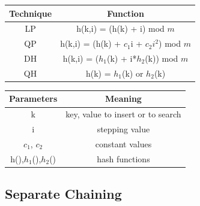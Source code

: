\documentclass{article}
\begin{document}
\begin{center}
\begin{tabular}{c|c}
    Technique & Function\\
\hline
    LP & h(k,i) = (h(k) + i) mod $m$ \\
\hline
    QP & h(k,i) = (h(k) + $c_1$i + $c_2i^2$) mod $m$ \\
\hline
    DH & h(k,i) = ($h_1$(k) + i*$h_2$(k)) mod $m$ \\
\hline
    QH & h(k) = $h_1$(k) or $h_2$(k) \\
\end{tabular}

\begin{tabular}{c|c}
    Parameters & Meaning \\
\hline
    k & key, value to insert or to search \\
\hline
    i & stepping value \\
\hline
    $c_1$, $c_2$ & constant values \\
\hline
    h(),$h_1$(),$h_2$() & hash functions \\
\end{tabular}
\end{center}

    \subsection{Separate Chaining}
    
\end{document}
